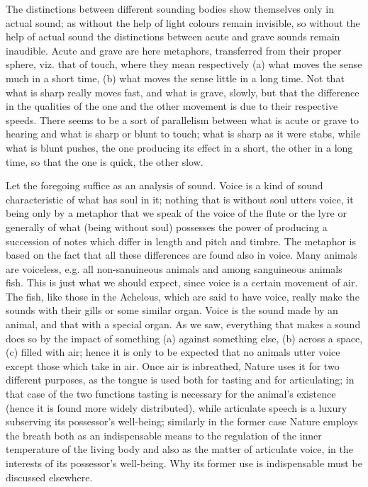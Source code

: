 The distinctions between different sounding bodies show themselves
only in actual sound; as without the help of light colours remain
invisible, so without the help of actual sound the distinctions between
acute and grave sounds remain inaudible. Acute and grave are here
metaphors, transferred from their proper sphere, viz. that of touch,
where they mean respectively (a) what moves the sense much in a short
time, (b) what moves the sense little in a long time. Not that what
is sharp really moves fast, and what is grave, slowly, but that the
difference in the qualities of the one and the other movement is due
to their respective speeds. There seems to be a sort of parallelism
between what is acute or grave to hearing and what is sharp or blunt
to touch; what is sharp as it were stabs, while what is blunt pushes,
the one producing its effect in a short, the other in a long time,
so that the one is quick, the other slow. 

Let the foregoing suffice as an analysis of sound. Voice is a kind
of sound characteristic of what has soul in it; nothing that is without
soul utters voice, it being only by a metaphor that we speak of the
voice of the flute or the lyre or generally of what (being without
soul) possesses the power of producing a succession of notes which
differ in length and pitch and timbre. The metaphor is based on the
fact that all these differences are found also in voice. Many animals
are voiceless, e.g. all non-sanuineous animals and among sanguineous
animals fish. This is just what we should expect, since voice is a
certain movement of air. The fish, like those in the Achelous, which
are said to have voice, really make the sounds with their gills or
some similar organ. Voice is the sound made by an animal, and that
with a special organ. As we saw, everything that makes a sound does
so by the impact of something (a) against something else, (b) across
a space, (c) filled with air; hence it is only to be expected that
no animals utter voice except those which take in air. Once air is
inbreathed, Nature uses it for two different purposes, as the tongue
is used both for tasting and for articulating; in that case of the
two functions tasting is necessary for the animal's existence (hence
it is found more widely distributed), while articulate speech is a
luxury subserving its possessor's well-being; similarly in the former
case Nature employs the breath both as an indispensable means to the
regulation of the inner temperature of the living body and also as
the matter of articulate voice, in the interests of its possessor's
well-being. Why its former use is indispensable must be discussed
elsewhere. 

